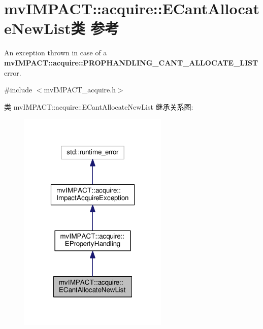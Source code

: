\hypertarget{classmv_i_m_p_a_c_t_1_1acquire_1_1_e_cant_allocate_new_list}{\section{mv\+I\+M\+P\+A\+C\+T\+:\+:acquire\+:\+:E\+Cant\+Allocate\+New\+List类 参考}
\label{classmv_i_m_p_a_c_t_1_1acquire_1_1_e_cant_allocate_new_list}
}


An exception thrown in case of a {\bfseries mv\+I\+M\+P\+A\+C\+T\+::acquire\+::\+P\+R\+O\+P\+H\+A\+N\+D\+L\+I\+N\+G\+\_\+\+C\+A\+N\+T\+\_\+\+A\+L\+L\+O\+C\+A\+T\+E\+\_\+\+L\+I\+S\+T} error.  




{\ttfamily \#include $<$mv\+I\+M\+P\+A\+C\+T\+\_\+acquire.\+h$>$}



类 mv\+I\+M\+P\+A\+C\+T\+:\+:acquire\+:\+:E\+Cant\+Allocate\+New\+List 继承关系图\+:
\nopagebreak
\begin{figure}[H]
\begin{center}
\leavevmode
\includegraphics[width=202pt]{classmv_i_m_p_a_c_t_1_1acquire_1_1_e_cant_allocate_new_list__inherit__graph}
\end{center}
\end{figure}


